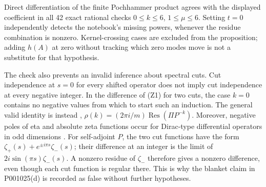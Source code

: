 \begin{remark}\oursComputed
Direct differentiation of the finite Pochhammer product agrees with the
displayed coefficient in all 42 exact rational checks
\(0\le k\le6\), \(1\le\mu\le6\). Setting \(t=0\) independently
detects the notebook's missing powers, whenever the residue combination
is nonzero. Kernel-crossing cases are excluded from the proposition;
adding \(h(A)\) at zero without tracking which zero modes move is not a
substitute for that hypothesis.

The check also prevents an invalid inference about spectral cuts.
Cut independence at \(s=0\) for every shifted operator does not imply
cut independence at every negative integer. In the difference of (Z1)
for two cuts, the case \(k=0\) contains no negative values from which to
start such an induction. The general valid identity is instead
\citet[Theorem 4.2]{ponge2006spectral},
\(\rho(k)=(2\pi i/m)\operatorname{Res}(\Pi P^{-k})\).
Moreover, negative poles of eta and absolute zeta functions occur for
Dirac-type differential operators in odd dimensions
\citep[\S4]{loyamoroianu2012singularities}. For self-adjoint \(P\), the
two cut functions have the form
\(\zeta_+(s)+e^{\pm i\pi s}\zeta_-(s)\); their difference at an
integer is the limit of \(2i\sin(\pi s)\zeta_-(s)\).
A nonzero residue of \(\zeta_-\) therefore gives a nonzero difference,
even though each cut function is regular there. This is why the blanket
claim in P001025(d) is recorded as false without further hypotheses.
\end{remark}

